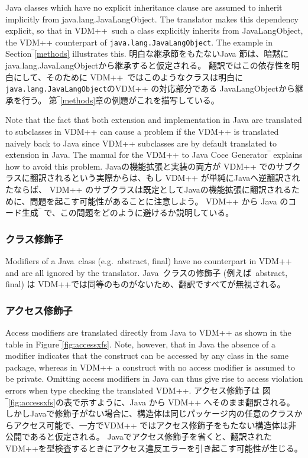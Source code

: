 \documentclass[\pformat,12pt]{jarticle}
\newcommand{\JAVA}{Java}
\newcommand{\VDM}{VDM++}
\begin{document}
Java classes which have no explicit inheritance clause are assumed to
inherit implicitly from java.lang.JavaLangObject. The translator makes this
dependency explicit, so that in \VDM\ such a class explicitly inherits
from JavaLangObject, the VDM++ counterpart of
\texttt{java.lang.JavaLangObject}. The example in Section‾\ref{methods}
illustrates this.
明白な継承節をもたないJava 節は、暗黙に java.lang.JavaLangObjectから継承すると仮定される。
翻訳ではこの依存性を明白にして、そのために \VDM\ ではこのようなクラスは明白に \texttt{java.lang.JavaLangObject}のVDM++ の対応部分である JavaLangObjectから継承を行う。
第‾\ref{methods}章の例題がこれを描写している。

Note that the fact that both extension and implementation in Java are
translated to subclasses in VDM++ can cause a problem if the VDM++ is
translated naively back to Java since VDM++ subclasses are by default
translated to extension in Java. The manual for the VDM++ to Java Coce
Generator‾\cite{CGJavaManPP-CSK} explains how to avoid this problem. 
Javaの機能拡張と実装の両方が VDM++ でのサブクラスに翻訳されるという実際からは、もし VDM++ が単純にJavaへ逆翻訳されたならば、 VDM++ のサブクラスは既定としてJavaの機能拡張に翻訳されるために、問題を起こす可能性があることに注意しよう。
 VDM++ から Java のコード生成‾\cite{CGJavaManPP-CSK} で、この問題をどのように避けるか説明している。 

\subsubsection{クラス修飾子}

Modifiers of a \JAVA\ class (e.g.\ abstract, final) have no
counterpart in VDM++ and are all ignored by the translator. 
 \JAVA\ クラスの修飾子 (例えば\ abstract, final) は VDM++では同等のものがないため、翻訳ですべてが無視される。

\subsubsection{アクセス修飾子}

Access modifiers are translated directly from Java to VDM++ as shown
in the table in Figure‾\ref{fig:accessxfs}. Note, however, that in Java the absence
of a modifier indicates that the construct can be accessed by any
class in the same package, whereas in VDM++ a construct with no access
modifier is assumed to be private. Omitting access modifiers in Java
can thus give rise to access violation errors when type checking the
translated VDM++. 
アクセス修飾子は 図‾\ref{fig:accessxfs}の表で示すように、Java から VDM++ へそのまま翻訳される。
しかしJavaで修飾子がない場合に、構造体は同じパッケージ内の任意のクラスからアクセス可能で、一方でVDM++ ではアクセス修飾子をもたない構造体は非公開であると仮定される。
Javaでアクセス修飾子を省くと、翻訳された VDM++を型検査するときにアクセス違反エラーを引き起こす可能性が生じる。
\end{document}
